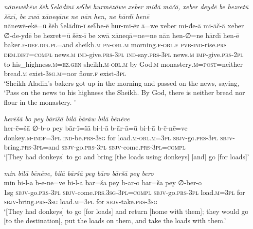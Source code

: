 \ea \label{HB.2}
\textit{nānewēkēw šēh ʕelādīnī seʕbē hurmēzāwe xeber miđā māčā, xeber deydē be hezretū šēxī, be xwā xāneqāne ne nān hen, ne hārdī henē} \\ 
\gll nānewē-ekē=ū šēh ʕelādīn-ī seʕbe-ē hur-mi-ēz ā=we xeber mi-đe-ā mi-āč-ā xeber ∅-de-ydē be hezret=ū šēx-ī be xwā xāneqā=ne=ne nān hen-∅=ne hārdī hen-ē \\ 
 baker\textsc{\textsc{.f}}\textsc{-def}\textsc{.dir}\textsc{.pl}=and sheikh\textsc{.m} \textsc{pn}\textsc{-obl}\textsc{.m} morning\textsc{\textsc{.f}}\textsc{-obl}\textsc{\textsc{.f}} \textsc{pvb-}\textsc{ind-}rise\textsc{.prs} \textsc{dem.dist}\textsc{=compl} news\textsc{.m} \textsc{ind-}give\textsc{.prs}\textsc{-3pl} \textsc{ind-}say\textsc{.prs}\textsc{-3pl} news\textsc{.m} \textsc{imp-}give\textsc{.prs}\textsc{-2pl} to his\_highness\textsc{.m}\textsc{=ez}\textsc{.gen} sheikh\textsc{.m}\textsc{-obl}\textsc{.m} by God\textsc{.m} monastery\textsc{.m}\textsc{=\textsc{post}}=neither bread\textsc{.m} exist\textsc{-3sg}\textsc{.m}=nor flour\textsc{\textsc{.f}} exist\textsc{-3pl} \\ 
\glt `Sheikh Aladin’s bakers got up in the morning and passed on the news, saying, ‘Pass on the news to his highness the Sheikh. By God, there is neither bread nor flour in the monastery. '
\z 
 
\ea \label{HB.9}
\textit{herēšā bo pey bārīšā bilā bārāw bilā bēnēve} \\ 
\gll her-ē=šā ∅-b-o pey bār-ī=šā bi-l-ā b-ār-ā=ū bi-l-ā b-ē-nē=ve \\ 
 donkey\textsc{.m}\textsc{-indf}\textsc{=3pl} \textsc{ind-}be\textsc{.prs}\textsc{-3sg} for load\textsc{.m}\textsc{-obl}\textsc{.m}\textsc{=3pl} \textsc{sbjv-}go\textsc{.prs}\textsc{-3pl} \textsc{sbjv-}bring\textsc{.prs}\textsc{-3pl}=and \textsc{sbjv-}go\textsc{.prs}\textsc{-3pl} \textsc{sbjv-}come\textsc{.prs}\textsc{-3pl}\textsc{=compl} \\ 
\glt `[They had donkeys] to go and bring [the loads using donkeys] [and] go [for loads]'
\z 
 
\ea \label{HB.10}
\textit{min bilā bēnēve, bilā bāršā pey bāro bāršā pey bero} \\ 
\gll min bi-l-ā b-ē-nē=ve bi-l-ā bār=šā pey b-ār-o bār=šā pey ∅-ber-o \\ 
 1sg \textsc{sbjv-}go\textsc{.prs}\textsc{-3pl} \textsc{sbjv-}come\textsc{.prs}\textsc{.3sg}\textsc{-3pl}\textsc{=compl} \textsc{sbjv-}go\textsc{.prs}\textsc{-3pl} load\textsc{.m}\textsc{=3pl} for \textsc{sbjv-}bring\textsc{.prs}\textsc{-3sg} load\textsc{.m}\textsc{=3pl} for \textsc{sbjv-}take\textsc{.prs}\textsc{-3sg} \\ 
\glt `[They had donkeys] to go [for loads] and return [home with them]; they would go [to the destination], put the loads on them, and take the loads with them.'
\z 
 
